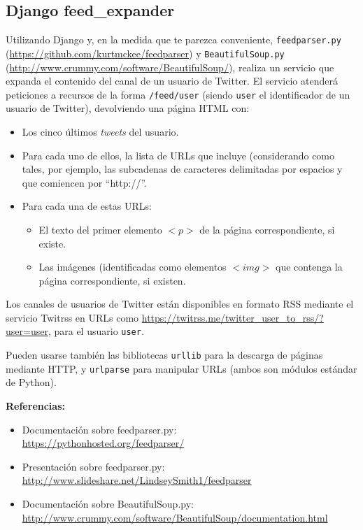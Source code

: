 \subsection{Django feed\_expander}
\label{subsec:django-feed-expander}

Utilizando Django y, en la medida que te parezca conveniente, \texttt{feedparser.py} (\url{https://github.com/kurtmckee/feedparser}) y \texttt{BeautifulSoup.py} (\url{http://www.crummy.com/software/BeautifulSoup/}), realiza un servicio que expanda el contenido del canal de un usuario de Twitter. El servicio atenderá peticiones a recursos de la forma \verb|/feed/user| (siendo  \texttt{user} el identificador de un usuario de Twitter), devolviendo una página HTML con:

\begin{itemize}
\item Los cinco últimos \emph{tweets} del usuario.
\item Para cada uno de ellos, la lista de URLs que incluye (considerando como tales, por ejemplo, las subcadenas de caracteres delimitadas por espacios y que comiencen por ``http://''.
\item Para cada una de estas URLs:
  \begin{itemize}
  \item El texto del primer elemento $<p>$ de la página correspondiente, si existe.
  \item Las imágenes (identificadas como elementos $<img>$ que contenga la página correspondiente, si existen.
  \end{itemize}
\end{itemize}

Los canales de usuarios de Twitter están disponibles en formato RSS mediante el servicio Twitrss en URLs como \url{https://twitrss.me/twitter_user_to_rss/?user=user}, para el usuario \texttt{user}.

Pueden usarse también las bibliotecas \texttt{urllib} para la descarga de páginas mediante HTTP, y \texttt{urlparse} para manipular URLs (ambos son módulos estándar de Python).

\textbf{Referencias:}

\begin{itemize}
\item Documentación sobre feedparser.py: \\
  \url{https://pythonhosted.org/feedparser/}
\item Presentación sobre feedparser.py: \\
  \url{http://www.slideshare.net/LindseySmith1/feedparser}
\item Documentación sobre BeautifulSoup.py: \\
  \url{http://www.crummy.com/software/BeautifulSoup/documentation.html}
\end{itemize}


